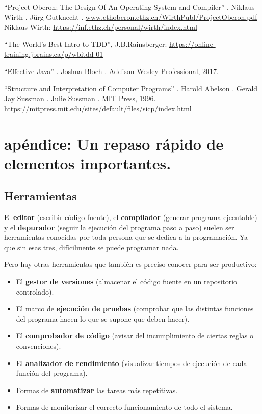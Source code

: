 \documentclass[spanish,12pt,a4paper,final,oneside]{book}
\begin{document}
``Project Oberon: The Design Of An Operating System and Compiler'' . Niklaus Wirth . Jürg Gutknecht . \url{www.ethoberon.ethz.ch/WirthPubl/ProjectOberon.pdf}
Niklaus Wirth: \url{https://inf.ethz.ch/personal/wirth/index.html}

``The World’s Best Intro to TDD'', J.B.Rainsberger: \url{https://online-training.jbrains.ca/p/wbitdd-01}

``Effective Java'' . Joshua Bloch . Addison-Wesley Professional, 2017.

``Structure and Interpretation of Computer Programs'' . Harold Abelson . Gerald Jay Sussman . Julie Sussman . MIT Press, 1996.
\url{https://mitpress.mit.edu/sites/default/files/sicp/index.html}

\chapter{apéndice: Un repaso rápido de elementos importantes.}
\section{Herramientas}

El \textbf{editor} (escribir código fuente), el \textbf{compilador} (generar programa ejecutable) y el \textbf{depurador} (seguir la ejecución del programa paso a paso) suelen ser herramientas conocidas por toda persona que se dedica a la programación. Ya que sin esas tres, difícilmente se puede programar nada.

Pero hay otras herramientas que también es preciso conocer para ser productivo:
\begin{itemize}
\item El \textbf{gestor de versiones} (almacenar el código fuente en un repositorio controlado).
\item El marco de \textbf{ejecución de pruebas} (comprobar que las distintas funciones del programa hacen lo que se supone que deben hacer).
\item El \textbf{comprobador de código} (avisar del incumplimiento de ciertas reglas o convenciones).
\item El \textbf{analizador de rendimiento} (visualizar tiempos de ejecución de cada función del programa).
\item Formas de \textbf{automatizar} las tareas más repetitivas.
\item Formas de monitorizar el correcto funcionamiento de todo el sistema.
\end{itemize}
\end{document}
